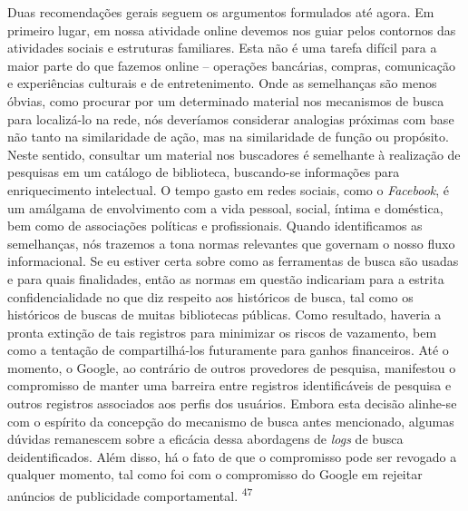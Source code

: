 Duas recomendações gerais seguem os argumentos formulados até agora. Em
primeiro lugar, em nossa atividade online devemos nos guiar pelos
contornos das atividades sociais e estruturas familiares. Esta não é uma
tarefa difícil para a maior parte do que fazemos online -- operações
bancárias, compras, comunicação e experiências culturais e de
entretenimento. Onde as semelhanças são menos óbvias, como procurar por
um determinado material nos mecanismos de busca para localizá-lo na
rede, nós deveríamos considerar analogias próximas com base não tanto na
similaridade de ação, mas na similaridade de função ou propósito. Neste
sentido, consultar um material nos buscadores é semelhante à realização
de pesquisas em um catálogo de biblioteca, buscando-se informações para
enriquecimento intelectual. O tempo gasto em redes sociais, como o
\emph{Facebook}, é um amálgama de envolvimento com a vida pessoal,
social, íntima e doméstica, bem como de associações políticas e
profissionais. Quando identificamos as semelhanças, nós trazemos a tona
normas relevantes que governam o nosso fluxo informacional. Se eu
estiver certa sobre como as ferramentas de busca são usadas e para quais
finalidades, então as normas em questão indicariam para a estrita
confidencialidade no que diz respeito aos históricos de busca, tal como
os históricos de buscas de muitas bibliotecas públicas. Como resultado,
haveria a pronta extinção de tais registros para minimizar os riscos de
vazamento, bem como a tentação de compartilhá-los futuramente para
ganhos financeiros. Até o momento, o Google, ao contrário de outros
provedores de pesquisa, manifestou o compromisso de manter uma barreira
entre registros identificáveis de pesquisa e outros registros associados
aos perfis dos usuários. Embora esta decisão alinhe-se com o espírito da
concepção do mecanismo de busca antes mencionado, algumas dúvidas
remanescem sobre a eficácia dessa abordagens de \emph{logs} de busca
deidentificados. Além disso, há o fato de que o compromisso pode ser
revogado a qualquer momento, tal como foi com o compromisso do Google em
rejeitar anúncios de publicidade comportamental. \textsuperscript{{47}}

